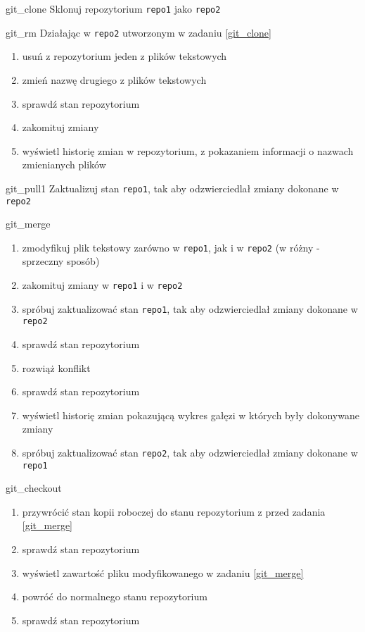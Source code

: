 \begin{Zadanie}{}{git_clone}
Sklonuj repozytorium \Verb#repo1# jako \Verb#repo2#
\end{Zadanie}

\begin{Zadanie}{}{git_rm}
Działając w \Verb#repo2# utworzonym w zadaniu \ref{git_clone}
\begin{enumerate}
\item usuń z repozytorium jeden z plików tekstowych
\item zmień nazwę drugiego z plików tekstowych
\item sprawdź stan repozytorium
\item zakomituj zmiany
\item wyświetl historię zmian w repozytorium, z pokazaniem informacji o nazwach zmienianych plików
\end{enumerate}
\end{Zadanie}

\begin{Zadanie}{}{git_pull1}
Zaktualizuj stan \Verb#repo1#, tak aby odzwierciedlał zmiany dokonane w \Verb#repo2#
\end{Zadanie}

\begin{Zadanie}{}{git_merge}
\begin{enumerate}
\item zmodyfikuj plik tekstowy zarówno w \Verb#repo1#, jak i w \Verb#repo2# (w różny - sprzeczny sposób)
\item zakomituj zmiany w \Verb#repo1# i w \Verb#repo2#
\item spróbuj zaktualizować stan \Verb#repo1#, tak aby odzwierciedlał zmiany dokonane w \Verb#repo2#
\item sprawdź stan repozytorium
\item rozwiąż konflikt
\item sprawdź stan repozytorium
\item wyświetl historię zmian pokazującą wykres gałęzi w których były dokonywane zmiany
\item spróbuj zaktualizować stan \Verb#repo2#, tak aby odzwierciedlał zmiany dokonane w \Verb#repo1#
\end{enumerate}
\end{Zadanie}

\begin{Zadanie}{}{git_checkout}
\begin{enumerate}
\item przywrócić stan kopii roboczej do stanu repozytorium z przed zadania \ref{git_merge}
\item sprawdź stan repozytorium
\item wyświetl zawartość pliku modyfikowanego w zadaniu \ref{git_merge}
\item powróć do normalnego stanu repozytorium
\item sprawdź stan repozytorium
\end{enumerate}
\end{Zadanie}

